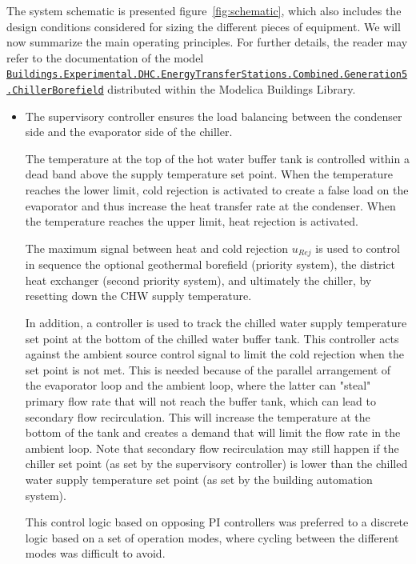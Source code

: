 The system schematic is presented figure~\ref{fig:schematic}, which also includes the design conditions considered for sizing the different pieces of equipment.
We will now summarize the main operating principles. For further details, the reader may refer to the documentation of the model \href{https://simulationresearch.lbl.gov/modelica/releases/v8.0.0/help/Buildings\_Experimental\_DHC\_EnergyTransferStations\_Combined\_Generation5.html#Buildings.Experimental.DHC.EnergyTransferStations.Combined.Generation5.ChillerBorefield}{\lstinline|Buildings.Experimental.DHC.EnergyTransferStations.Combined.Generation5.ChillerBorefield|} distributed within the Modelica Buildings Library.
\begin{itemize}
    \item The supervisory controller ensures the load balancing between the condenser side and the evaporator side of the chiller.

    The temperature at the top of the hot water buffer tank is controlled within a dead band above the supply temperature set point.
    When the temperature reaches the lower limit, cold rejection is activated to create a false load on the evaporator and thus increase the heat transfer rate at the condenser.
    When the temperature reaches the upper limit, heat rejection is activated.

    The maximum signal between heat and cold rejection $u_{Rej}$ is used to control in sequence the optional geothermal borefield (priority system), the district heat exchanger (second priority system), and ultimately the chiller, by resetting down the CHW supply temperature.

    In addition, a controller is used to track the chilled water supply temperature set point at the bottom of the chilled water buffer tank. This controller acts against the ambient source control signal to limit the cold rejection when the set point is not met. This is needed because of the parallel arrangement of the evaporator loop and the ambient loop, where the latter can "steal" primary flow rate that will not reach the buffer tank, which can lead to secondary flow recirculation. This will increase the temperature at the bottom of the tank and creates a demand that will limit the flow rate in the ambient loop. Note that secondary flow recirculation may still happen if the chiller set point (as set by the supervisory controller) is lower than the chilled water supply temperature set point (as set by the building automation system).

    This control logic based on opposing PI controllers was preferred to a discrete logic based on a set of operation modes, where cycling between the different modes was difficult to avoid.


\end{itemize}
